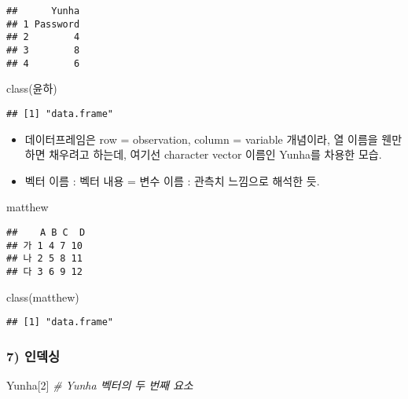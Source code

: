 \documentclass[
  12,
]{article}
\newenvironment{Shaded}{\begin{snugshade}}{\end{snugshade}}
\newcommand{\CommentTok}[1]{\textcolor[rgb]{0.56,0.35,0.01}{\textit{#1}}}
\newcommand{\DecValTok}[1]{\textcolor[rgb]{0.00,0.00,0.81}{#1}}
\newcommand{\FunctionTok}[1]{\textcolor[rgb]{0.00,0.00,0.00}{#1}}
\newcommand{\NormalTok}[1]{#1}
\begin{document}
\begin{verbatim}
##      Yunha
## 1 Password
## 2        4
## 3        8
## 4        6
\end{verbatim}

\begin{Shaded}
\begin{Highlighting}[]
\FunctionTok{class}\NormalTok{(윤하)}
\end{Highlighting}
\end{Shaded}

\begin{verbatim}
## [1] "data.frame"
\end{verbatim}

\begin{itemize}
\item
  데이터프레임은 row = observation, column = variable 개념이라, 열
  이름을 웬만하면 채우려고 하는데, 여기선 character vector 이름인
  Yunha를 차용한 모습.
\item
  벡터 이름 : 벡터 내용 = 변수 이름 : 관측치 느낌으로 해석한 듯.
\end{itemize}

\begin{Shaded}
\begin{Highlighting}[]
\NormalTok{matthew}
\end{Highlighting}
\end{Shaded}

\begin{verbatim}
##    A B C  D
## 가 1 4 7 10
## 나 2 5 8 11
## 다 3 6 9 12
\end{verbatim}

\begin{Shaded}
\begin{Highlighting}[]
\FunctionTok{class}\NormalTok{(matthew)}
\end{Highlighting}
\end{Shaded}

\begin{verbatim}
## [1] "data.frame"
\end{verbatim}

\hypertarget{uxc778uxb371uxc2f1}{%
\subsubsection{7) 인덱싱}\label{uxc778uxb371uxc2f1}}

\begin{Shaded}
\begin{Highlighting}[]
\NormalTok{Yunha[}\DecValTok{2}\NormalTok{] }\CommentTok{\# Yunha 벡터의 두 번째 요소}
\end{Highlighting}
\end{Shaded}
\end{document}
